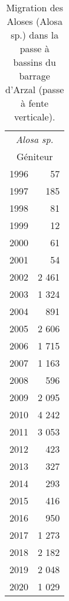 \begin{table}[ht]
\centering
\begin{tabular}{lr}
  \toprule
\multicolumn{2}{c}{\textit{Alosa sp.}}  \\ 
\multicolumn{2}{c}{Géniteur} \\
\midrule
1996 & 57 \\ 
  1997 & 185 \\ 
  1998 & 81 \\ 
  1999 & 12 \\ 
  2000 & 61 \\ 
  2001 & 54 \\ 
  2002 & 2 461 \\ 
  2003 & 1 324 \\ 
  2004 & 891 \\ 
  2005 & 2 606 \\ 
  2006 & 1 715 \\ 
  2007 & 1 163 \\ 
  2008 & 596 \\ 
  2009 & 2 095 \\ 
  2010 & 4 242 \\ 
  2011 & 3 053 \\ 
  2012 & 423 \\ 
  2013 & 327 \\ 
  2014 & 293 \\ 
  2015 & 416 \\ 
  2016 & 950 \\ 
  2017 & 1 273 \\ 
  2018 & 2 182 \\ 
  2019 & 2 048 \\ 
  2020 & 1 029 \\ 
   \bottomrule
\end{tabular}
\caption{Migration des Aloses (Alosa sp.) dans la passe à bassins du barrage
				d'Arzal (passe à fente verticale).} 
\label{table_bilanannuel_ala}
\end{table}
